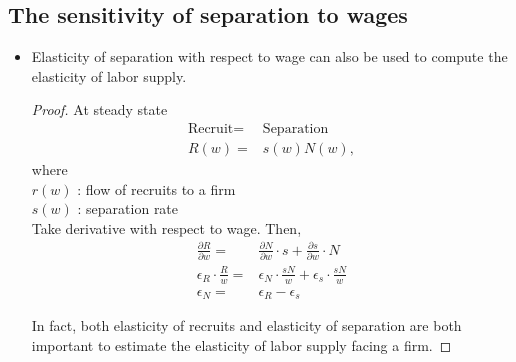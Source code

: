 \documentclass[a4paper, 12pt]{article}
\begin{document}
\subsection{The sensitivity of separation to wages}
\begin{itemize}
\item Elasticity of separation with respect to wage can also be used to compute the elasticity of labor supply.
\begin{proof}
At steady state
\begin{align*}
\text{Recruit} =& \text{Separation} \\
R(w) =& s(w)N(w),
\end{align*}
where \\
 $r(w)$ : flow of recruits to a firm \\
 $s(w)$ : separation rate \\
 Take derivative with respect to wage. Then,
 \begin{align*}
\frac{\partial R}{\partial w}
=&
\frac{\partial N}{\partial w} \cdot s
+
\frac{\partial s}{\partial w} \cdot N \\
\epsilon_R \cdot \frac{R}{w} 
=&
\epsilon_N \cdot \frac{sN}{w}
+
\epsilon_s \cdot \frac{sN}{w} \\
\epsilon_N =& \epsilon_R - \epsilon_s
 \end{align*}
 
In fact, both elasticity of recruits and elasticity of separation are both important to estimate the elasticity of labor supply facing a firm.
\end{proof}


\end{itemize}
\end{document}
